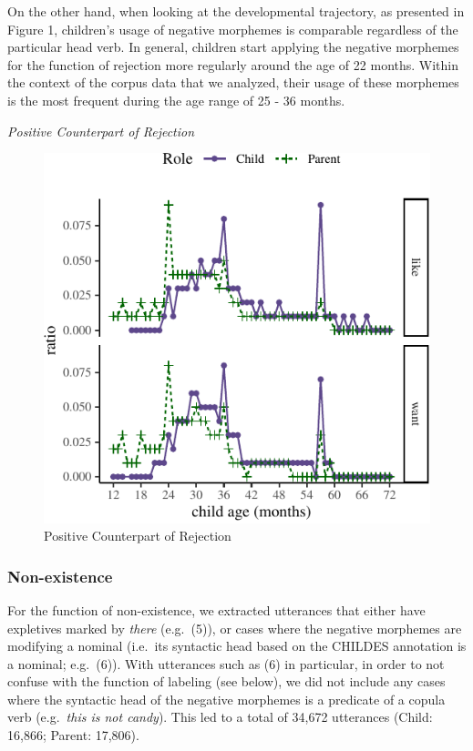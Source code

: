 \documentclass[
  english,
  man,floatsintext]{apa6}
\begin{document}
On the other hand, when looking at the developmental trajectory, as presented in Figure 1, children's usage of negative morphemes is comparable regardless of the particular head verb. In general, children start applying the negative morphemes for the function of rejection more regularly around the age of 22 months. Within the context of the corpus data that we analyzed, their usage of these morphemes is the most frequent during the age range of 25 - 36 months.

\emph{Positive Counterpart of Rejection}

\begin{figure}[H]

{\centering \includegraphics{neg_combos_full_files/figure-latex/posemotion-1} 

}

\caption{Positive Counterpart of Rejection}\label{fig:posemotion}
\end{figure}

\hypertarget{non-existence}{%
\subsubsection{Non-existence}\label{non-existence}}

For the function of non-existence, we extracted utterances that either have expletives marked by \emph{there} (e.g.~(5)), or cases where the negative morphemes are modifying a nominal (i.e.~its syntactic head based on the CHILDES annotation is a nominal; e.g.~(6)). With utterances such as (6) in particular, in order to not confuse with the function of labeling (see below), we did not include any cases where the syntactic head of the negative morphemes is a predicate of a copula verb (e.g.~\emph{this is not candy}). This led to a total of 34,672 utterances (Child: 16,866; Parent: 17,806).
\end{document}
